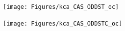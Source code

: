 \begin{figure}[ht]
    \centering
    \begin{subfigure}{.45\textwidth}
        \centering
        \texttt{[image: Figures/kca\_CAS\_ODDST\_oc]}
        \label{fig:gdd_wloc}
        \caption{}
    \end{subfigure}
    \begin{subfigure}{.45\textwidth}
        \centering
        \texttt{[image: Figures/kca\_CAS\_ODDSTC\_oc]}
        \label{fig:gdd_wlcoc}
        \caption{}
    \end{subfigure}
    \caption{}
    \label{fig:kca_gdd_wl}
\end{figure}

